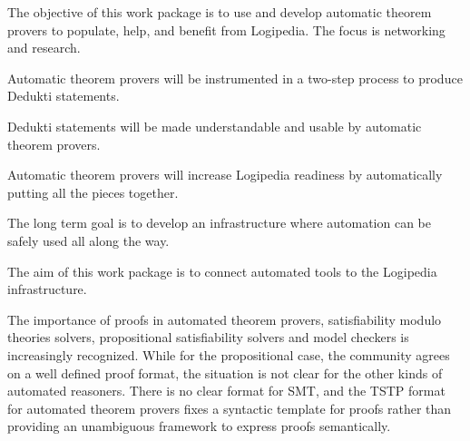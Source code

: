 \begin{workpackage}[id=atpetc,wphases=0-48,type=RTD,
  short=ATPs,%
  title={Automatic theorem provers},
  lead=Lie,
  LieRM=18,
  InnRM=6,
  PraRM=15,
  BelRM=12,
  SacRM=9,
  ImtRM=36,
  OcaRM=30,
  CeaRM=30,
  StuRM=18]


\begin{wpobjectives}
  The objective of this work package is to use and develop automatic
  theorem provers to populate, help, and benefit from Logipedia. The
  focus is networking and research.
  \begin{compactitem}
  \item Automatic theorem provers will be instrumented in a two-step
    process to produce Dedukti statements.
  \item Dedukti statements will be made understandable and usable by
    automatic theorem provers.
  \item Automatic theorem provers will increase Logipedia readiness by
    automatically putting all the pieces together.
  \end{compactitem}
  The long term goal is to develop an infrastructure where automation
  can be safely used all along the way.
\end{wpobjectives}


\begin{wpdescription}

  The aim of this work package is to connect automated tools to the Logipedia
  infrastructure.


The importance of proofs in automated theorem provers, satisfiability
modulo theories solvers, propositional satisfiability solvers and
model checkers is increasingly recognized.  While for the
propositional case, the community agrees on a well defined proof
format, the situation is not clear for the other kinds of automated
reasoners.  There is no clear format for SMT, and the TSTP format for
automated theorem provers fixes a syntactic template for proofs rather
than providing an unambiguous framework to express proofs
semantically.


\end{wpdescription}
\end{workpackage}
